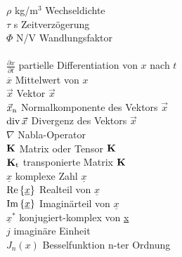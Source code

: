 \begin{tabbing}
$\rho$          \> kg/m$^3$ \> Wechseldichte\\
$\tau$          \> s        \> Zeitverzögerung\\
$\Phi$          \> N/V          \> Wandlungsfaktor\\
\\
$\frac{\partial x}{\partial t}$
                                                                \>      \> partielle Differentiation von $x$ nach $t$\\
$\overline{x}$                              \>  \> Mittelwert von $x$\\
$\vec{x}$                                               \>  \> Vektor $\vec{x}$\\
$\vec x_{\rm n}$                                \>  \> Normalkomponente des Vektors $\vec x$\\
${\rm div}\,\vec{x}$            \>  \> Divergenz des Vektors $\vec{x}$\\
$\nabla$                        \>  \> Nabla-Operator\\
${\bf K}$                                               \>  \> Matrix oder Tensor ${\bf K}$\\
${\bf K}_{\rm t}$                   \>  \> transponierte Matrix ${\bf K}$\\
$\underline{x}$                             \>  \> komplexe Zahl $\underline{x}$\\
$\mbox{\rm Re}\left\{\underline{x}\right\}$
                                \>  \> Realteil von $\underline{x}$\\
$\mbox{\rm Im}\left\{\underline{x}\right\}$
                                \>  \> Imaginärteil von $\underline{x}$\\
$\underline x^*$                                \>  \> konjugiert-komplex von \underline x\\
$j$                                 \>  \> imaginäre Einheit\\
$J_n(x)$                        \>  \> Besselfunktion n-ter Ordnung\\
\end{tabbing}
